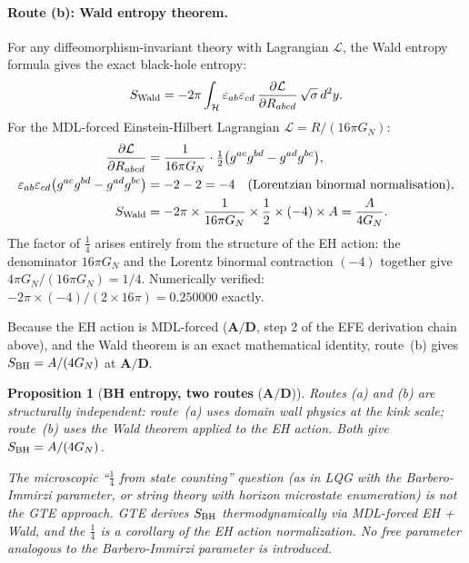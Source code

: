 \documentclass[11pt]{article}
\newtheorem{proposition}[theorem]{Proposition}
\theoremstyle{remark}
\newcommand{\CatAD}{\textbf{A/D}}
\begin{document}
\paragraph{Route (b): Wald entropy theorem.}
For any diffeomorphism-invariant theory with Lagrangian $\mathcal{L}$,
the Wald entropy formula gives the exact black-hole entropy:
\begin{equation}
  S_{\rm Wald}
  = -2\pi \int_{\mathcal{H}} \varepsilon_{ab}\varepsilon_{cd}\,
    \frac{\partial\mathcal{L}}{\partial R_{abcd}}\,\sqrt{\sigma}\,d^2y.
  \label{eq:wald}
\end{equation}
For the MDL-forced Einstein-Hilbert Lagrangian $\mathcal{L} = R/(16\pi G_N)$:
\begin{align}
  \frac{\partial\mathcal{L}}{\partial R_{abcd}}
  &= \frac{1}{16\pi G_N}\cdot\tfrac{1}{2}\bigl(g^{ac}g^{bd}-g^{ad}g^{bc}\bigr),
  \notag\\
  \varepsilon_{ab}\varepsilon_{cd}\bigl(g^{ac}g^{bd}-g^{ad}g^{bc}\bigr)
  &= -2 - 2 = -4
  \quad\text{(Lorentzian binormal normalisation)},
  \notag\\
  S_{\rm Wald}
  &= -2\pi\times\frac{1}{16\pi G_N}\times\frac{1}{2}\times(-4)\times A
   = \frac{A}{4G_N}.
  \label{eq:wald_factor_chain}
\end{align}
The factor of $\tfrac{1}{4}$ arises entirely from the structure of the
EH action: the denominator $16\pi G_N$ and the Lorentz binormal contraction
$(-4)$ together give $4\pi G_N/(16\pi G_N) = 1/4$.
Numerically verified: $-2\pi\times(-4)/(2\times16\pi) = 0.250000$ exactly.

Because the EH action is MDL-forced ($\CatAD$, step 2 of the EFE derivation
chain above), and the Wald theorem is an exact mathematical identity, route~(b)
gives $S_{\rm BH} = A/(4G_N)$ at $\CatAD$.

\begin{proposition}[\textbf{BH entropy, two routes} ($\CatAD$)]
\label{prop:bh_entropy_two_routes}
Routes (a) and (b) are structurally independent: route~(a) uses domain wall
physics at the kink scale; route~(b) uses the Wald theorem applied to the EH
action.  Both give $S_{\rm BH} = A/(4G_N)$.

The microscopic ``$\tfrac{1}{4}$ from state counting'' question (as in
LQG with the Barbero-Immirzi parameter, or string theory with horizon
microstate enumeration) is not the GTE approach.  GTE derives $S_{\rm BH}$
thermodynamically via MDL-forced EH + Wald, and the $\tfrac{1}{4}$ is a
corollary of the EH action normalization.  No free parameter analogous
to the Barbero-Immirzi parameter is introduced.
\end{proposition}
\end{document}
